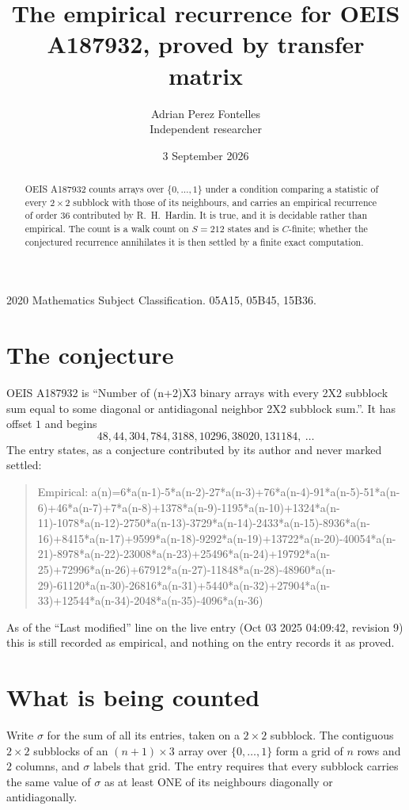 \documentclass[11pt,a4paper]{article}
\title{The empirical recurrence for OEIS A187932, proved by transfer matrix}
\author{Adrian Perez Fontelles\\ \small Independent researcher}
\date{3 September 2026}
\theoremstyle{plain}
\theoremstyle{definition}
\begin{document}
\maketitle

\begin{abstract}
OEIS A187932 counts arrays over $\{0,\dots,1\}$ under a condition comparing a statistic of
every $2\times2$ subblock with those of its neighbours, and carries an empirical recurrence
of order $36$ contributed by R.~H.~Hardin. It is true, and it is decidable rather than
empirical. The count is a walk count on $S=212$ states and is $C$-finite; whether the
conjectured recurrence annihilates it is then settled by a finite exact computation.
\end{abstract}

\noindent\small 2020 Mathematics Subject Classification. 05A15, 05B45, 15B36.\normalsize

\section{The conjecture}

OEIS A187932 is ``Number of (n+2)X3 binary arrays with every 2X2 subblock sum equal to some diagonal or antidiagonal neighbor 2X2 subblock sum.''. It has offset $1$ and begins
\[
48, 44, 304, 784, 3188, 10296, 38020, 131184,\ \dots
\]
The entry states, as a conjecture contributed by its author and never marked settled:
\begin{quote}
Empirical: a(n)=6*a(n-1)-5*a(n-2)-27*a(n-3)+76*a(n-4)-91*a(n-5)-51*a(n-6)+46*a(n-7)+7*a(n-8)+1378*a(n-9)-1195*a(n-10)+1324*a(n-11)-1078*a(n-12)-2750*a(n-13)-3729*a(n-14)-2433*a(n-15)-8936*a(n-16)+8415*a(n-17)+9599*a(n-18)-9292*a(n-19)+13722*a(n-20)-40054*a(n-21)-8978*a(n-22)-23008*a(n-23)+25496*a(n-24)+19792*a(n-25)+72996*a(n-26)+67912*a(n-27)-11848*a(n-28)-48960*a(n-29)-61120*a(n-30)-26816*a(n-31)+5440*a(n-32)+27904*a(n-33)+12544*a(n-34)-2048*a(n-35)-4096*a(n-36)
\end{quote}
As of the ``Last modified'' line on the live entry (Oct 03 2025 04:09:42, revision 9) this is still
recorded as empirical, and nothing on the entry records it as proved.

\section{What is being counted}

Write $\sigma$ for the sum of all its entries, taken on a $2\times2$ subblock. The contiguous $2\times2$
subblocks of an $(n+1)\times3$ array over $\{0,\dots,1\}$ form a grid of $n$ rows
and $2$ columns, and $\sigma$ labels that grid. The entry
requires that every subblock carries the same value of $\sigma$ as at least ONE of its neighbours diagonally or antidiagonally.
\end{document}
